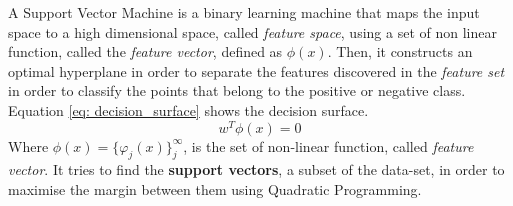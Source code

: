 \documentclass[11pt]{article}
\begin{document}
A Support Vector Machine is a binary learning machine that maps the input space to a high dimensional space, called \emph{feature space}, using a set of non linear function, 
called the \emph{feature vector}, defined as $\phi(x)$. Then, it constructs an optimal hyperplane in order to separate the features discovered in the \emph{feature set}
in order to classify the points that belong to the positive or negative class. Equation \ref{eq: decision_surface} shows the decision surface.
\begin{equation}
    w^T\phi(x)= 0	
        \label{eq: decision_surface}
\end{equation}
Where $\phi(x) = \{\varphi_j(x)\}_j^{\infty}$, is the set of non-linear function, called \emph{feature vector}. It tries to find the \textbf{support vectors}, a subset of the data-set, in order to maximise the margin between them using Quadratic Programming.
\end{document}
